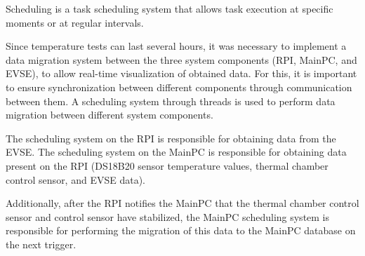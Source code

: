 Scheduling is a task scheduling system that allows task execution at specific moments or at regular intervals.

Since temperature tests can last several hours, it was necessary to implement a data migration system between the three system components (RPI, MainPC, and EVSE), to allow real-time visualization of obtained data. For this, it is important to ensure synchronization between different components through communication between them. A scheduling system through threads is used to perform data migration between different system components.

The scheduling system on the RPI is responsible for obtaining data from the EVSE. The scheduling system on the MainPC is responsible for obtaining data present on the RPI (DS18B20 sensor temperature values, thermal chamber control sensor, and EVSE data).

Additionally, after the RPI notifies the MainPC that the thermal chamber control sensor and control sensor have stabilized, the MainPC scheduling system is responsible for performing the migration of this data to the MainPC database on the next trigger.


